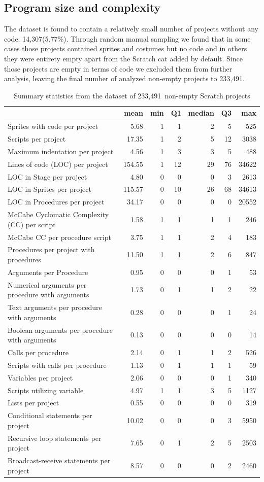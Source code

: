 \documentclass{sig-alternate}
\newcommand{\nemptyPrograms}{14,307}
\newcommand{\nScriptPrograms}{233,491}
\begin{document}
\subsection{Program size and complexity}

The dataset is found to contain a relatively small number of projects without any code: \nemptyPrograms (5.77\%). Through random manual sampling we found that in some cases those projects contained sprites and costumes but no code and in others they were entirety empty apart from the Scratch cat added by default. Since those projects are empty in terms of code we excluded them from further analysis, leaving the final number of analyzed non-empty projects to \nScriptPrograms.

\begin{table}[ht]
	\centering
	\begin{tabular}{lrrrrrr}
		\hline
		&\textbf{mean}&\textbf{min}&\textbf{Q1}&\textbf{median}&\textbf{Q3}&\textbf{max}\\
		\hline
		Sprites with code per project&5.68&1&1&2&5&525\\
		Scripts per project&17.35&1&2&5&12&3038\\
		Maximum indentation per project&4.56&1&3&3&5&488\\
		Lines of code (LOC) per project&154.55&1&12&29&76&34622\\
		LOC in Stage per project&4.80&0&0&0&3&2613\\
		LOC in Sprites per project&115.57&0&10&26&68&34613\\
		LOC in Procedures per project&34.17&0&0&0&0&20552\\
		McCabe Cyclomatic Complexity (CC) per script&1.58&1&1&1&1&246\\
		McCabe CC per procedure script&3.75&1&1&2&4&183\\
		Procedures per project with procedures&11.50&1&1&2&6&847\\
		Arguments per Procedure&0.95&0&0&0&1&53\\
		Numerical arguments per procedure with arguments&1.73&0&1&1&2&22\\
		Text arguments per procedure with arguments&0.28&0&0&0&1&24\\
		Boolean arguments per procedure with arguments&0.13&0&0&0&0&14\\
		Calls per procedure&2.14&0&1&1&2&526\\
		Scripts with calls per procedure&1.13&0&1&1&1&59\\
		Variables per project&2.06&0&0&0&1&340\\
		Scripts utilizing variable&4.97&1&1&3&5&1127\\
		Lists per project&0.55&0&0&0&0&319\\
		Conditional statements per project&10.02&0&0&0&3&5950\\
		Recursive loop statements per project&7.65&0&1&2&5&2503\\
		Broadcast-receive statements per project&8.57&0&0&0&2&2460\\	
		\hline
	\end{tabular}
	\caption{Summary statistics from the dataset of \nScriptPrograms~non-empty Scratch projects}
	\label{tbl-size}
\end{table}
\end{document}
